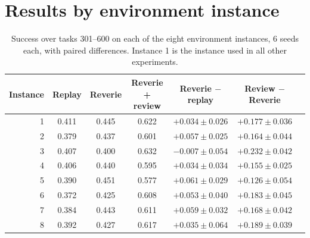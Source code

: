 \documentclass{article}
\begin{document}
\appendix

\section{Results by environment instance}
\label{app:instances}

\begin{table}[h]
\centering
\caption{Success over tasks 301--600 on each of the eight environment instances, 6
seeds each, with paired differences. Instance 1 is the instance used in all other
experiments.}
\label{tab:instances}
\small
\begin{tabular}{rcccccc}
\toprule
Instance & Replay & Reverie & Reverie + review & Reverie $-$ replay & Review $-$ Reverie \\
\midrule
1 & 0.411 & 0.445 & 0.622 & $+0.034 \pm 0.026$ & $+0.177 \pm 0.036$ \\
2 & 0.379 & 0.437 & 0.601 & $+0.057 \pm 0.025$ & $+0.164 \pm 0.044$ \\
3 & 0.407 & 0.400 & 0.632 & $-0.007 \pm 0.054$ & $+0.232 \pm 0.042$ \\
4 & 0.406 & 0.440 & 0.595 & $+0.034 \pm 0.034$ & $+0.155 \pm 0.025$ \\
5 & 0.390 & 0.451 & 0.577 & $+0.061 \pm 0.029$ & $+0.126 \pm 0.054$ \\
6 & 0.372 & 0.425 & 0.608 & $+0.053 \pm 0.040$ & $+0.183 \pm 0.045$ \\
7 & 0.384 & 0.443 & 0.611 & $+0.059 \pm 0.032$ & $+0.168 \pm 0.042$ \\
8 & 0.392 & 0.427 & 0.617 & $+0.035 \pm 0.064$ & $+0.189 \pm 0.039$ \\
\bottomrule
\end{tabular}
\end{table}
\end{document}
